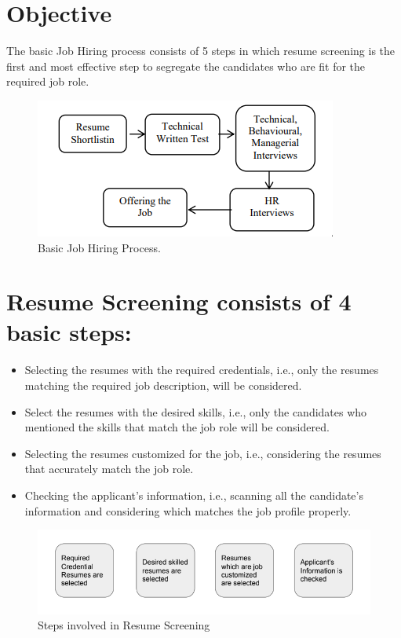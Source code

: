 \documentclass[12 pt, oneside]{book}
\begin{document}
\section{Objective}     %
The basic Job Hiring process consists of 5 steps in which 
resume screening is the first and most effective step to 
segregate the candidates who are fit for the required job role.

\begin{figure}[h]
\begin{center}
\includegraphics[width = 10 cm]{1.png}
\caption{Basic Job Hiring Process.}
\end{center}
\end{figure}

\section{Resume Screening consists of 4 basic steps:}
\begin{itemize}
    \item {Selecting the resumes with the required credentials, i.e., 
only the resumes matching the required job description,
will be considered.}
    \item {Select the resumes with the desired skills, i.e., only the 
candidates who mentioned the skills that match the job 
role will be considered.}
    \item {Selecting the resumes customized for the job, i.e., 
considering the resumes that accurately match the job 
role.}
    \item {Checking the applicant's information, i.e., scanning all 
the candidate's information and considering which 
matches the job profile properly.}
\end{itemize}

\begin{figure}[h]
\begin{center}
\includegraphics[width = 12 cm]{2.png}
\caption{ Steps involved in Resume Screening}
\end{center}
\end{figure}
\end{document}
